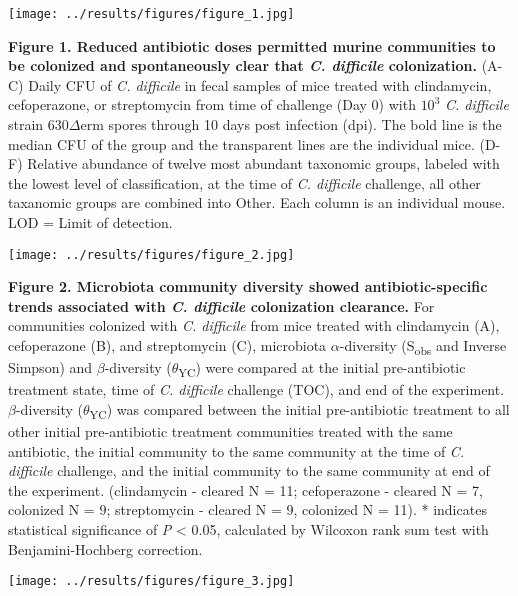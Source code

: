 \documentclass[11pt,]{article}
\begin{document}
\newpage

\texttt{[image: ../results/figures/figure\_1.jpg]}

\textbf{Figure 1. Reduced antibiotic doses permitted murine communities
to be colonized and spontaneously clear that \emph{C. difficile}
colonization.} (A-C) Daily CFU of \emph{C. difficile} in fecal samples
of mice treated with clindamycin, cefoperazone, or streptomycin from
time of challenge (Day 0) with \(10^{3}\) \emph{C. difficile} strain
630\(\Delta\)erm spores through 10 days post infection (dpi). The bold
line is the median CFU of the group and the transparent lines are the
individual mice. (D-F) Relative abundance of twelve most abundant
taxonomic groups, labeled with the lowest level of classification, at
the time of \emph{C. difficile} challenge, all other taxanomic groups
are combined into Other. Each column is an individual mouse. LOD = Limit
of detection.

\hfill\break

\texttt{[image: ../results/figures/figure\_2.jpg]}

\textbf{Figure 2. Microbiota community diversity showed
antibiotic-specific trends associated with \emph{C. difficile}
colonization clearance.} For communities colonized with \emph{C.
difficile} from mice treated with clindamycin (A), cefoperazone (B), and
streptomycin (C), microbiota \(\alpha\)-diversity (S\textsubscript{obs}
and Inverse Simpson) and \(\beta\)-diversity
(\(\theta\)\textsubscript{YC}) were compared at the initial
pre-antibiotic treatment state, time of \emph{C. difficile} challenge
(TOC), and end of the experiment. \(\beta\)-diversity
(\(\theta\)\textsubscript{YC}) was compared between the initial
pre-antibiotic treatment to all other initial pre-antibiotic treatment
communities treated with the same antibiotic, the initial community to
the same community at the time of \emph{C. difficile} challenge, and the
initial community to the same community at end of the experiment.
(clindamycin - cleared N = 11; cefoperazone - cleared N = 7, colonized N
= 9; streptomycin - cleared N = 9, colonized N = 11). * indicates
statistical significance of \emph{P} \textless{} 0.05, calculated by
Wilcoxon rank sum test with Benjamini-Hochberg correction.

\hfill\break

\texttt{[image: ../results/figures/figure\_3.jpg]}
\end{document}
